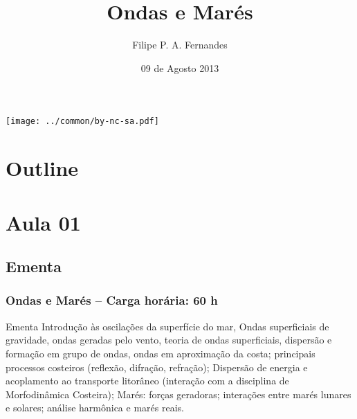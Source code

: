 \title[Aula 01]{Ondas e Marés}
\author[Filipe Fernandes]{Filipe P. A. Fernandes}
\date[Agosto 2013]{09 de Agosto 2013}




\begin{frame}[plain]
  \titlepage
  \begin{center}
    \texttt{[image: ../common/by-nc-sa.pdf]}
  \end{center}
\end{frame}

\section*{Outline}
\begin{frame}
\tableofcontents
\end{frame}


\section{Aula 01}
\subsection{Ementa}
\begin{frame}
    \frametitle{Ondas e Marés -- Carga horária: 60 h}
    {\small
    \begin{block}{Ementa}
        Introdução às oscilações da superfície do mar, Ondas superficiais de
        gravidade, ondas geradas pelo vento, teoria de ondas superficiais,
        dispersão e formação em grupo de ondas, ondas em aproximação da costa;
        principais processos costeiros (reflexão, difração, refração);
        Dispersão de energia e acoplamento ao transporte litorâneo (interação
        com a disciplina de Morfodinâmica Costeira); Marés: forças geradoras;
        interações entre marés lunares e solares; análise harmônica e marés reais.
    \end{block}
    }
\end{frame}

